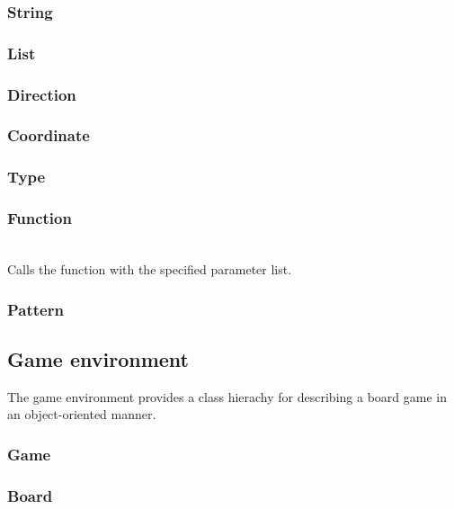 \subsubsection{String}

\subsubsection{List}

\subsubsection{Direction}

\subsubsection{Coordinate}

\subsubsection{Type}

\subsubsection{Function}

\begin{dlist}
  \item {}\\
    Calls the function with the specified parameter list. 
\end{dlist}

\subsubsection{Pattern}

\subsection{Game environment}
\label{sec:gameenvironment}

The game environment provides a class hierachy for describing a board game in an object-oriented manner.

\subsubsection{Game}

\subsubsection{Board}

